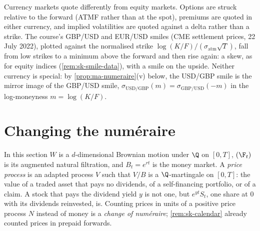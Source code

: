 Currency markets quote differently from equity markets. Options are struck relative to the
forward (ATMF rather than at the spot), premiums are quoted in either currency, and implied
volatilities are quoted against a delta rather than a strike. The course's GBP/USD and
EUR/USD smiles (CME settlement prices, 22 July 2022), plotted against the normalised strike
$\log(K/F)/(\sigma_{\mathrm{atm}}\sqrt T)$, fall from low strikes to a minimum above the forward and
then rise again: a skew, as for equity indices (\cref{rem:sk-smile-data}), with a smile on the upside.
Neither currency is special: by \cref{prop:ma-numeraire}(v) below, the USD/GBP smile is the mirror
image of the GBP/USD smile, $\sigma_{\mathrm{USD/GBP}}(m)=\sigma_{\mathrm{GBP/USD}}(-m)$ in the
log-moneyness $m=\log(K/F)$.

\section{Changing the num\'eraire}\label{sec:ma-numeraire}

In this section $W$ is a $d$-dimensional Brownian motion under $\Q$ on $[0,T]$, $(\F_t)$ is its
augmented natural filtration, and $B_t=e^{rt}$ is the money market. A \emph{price process} is
an adapted process $V$ such that $V/B$ is a $\Q$-martingale on $[0,T]$: the value of a traded
asset that pays no dividends, of a self-financing portfolio, or of a claim. A stock that pays
the dividend yield $y$ is not one, but $e^{yt}S_t$, one share at $0$ with its dividends
reinvested, is. Counting prices in units of a positive price process $N$ instead of money is a
\emph{change of num\'eraire}; \cref{rem:sk-calendar} already counted prices in prepaid forwards.

